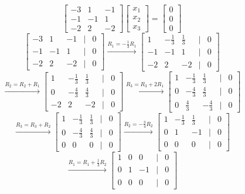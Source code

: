 \documentclass[12pt]{extarticle} %
\begin{document}
\begin{enumerate}
\[    \]
    \[
    \begin{bmatrix} -3 & 1 & -1\\ -1 & -1 & 1 \\ -2 & 2 & -2 \end{bmatrix} \begin{bmatrix} x_1 \\ x_2 \\ x_3 \end{bmatrix} = \begin{bmatrix} 0 \\ 0 \\ 0 \end{bmatrix}
    \]
    \[
    \begin{bmatrix} -3 & 1 & -1 & | & 0\\ -1 & -1 & 1 & | & 0 \\ -2 & 2 & -2 & | & 0 \end{bmatrix} \xrightarrow{R_1 = -\frac{1}{3}R_1} \begin{bmatrix} 1 & -\frac{1}{3} & \frac{1}{3} & | & 0\\ -1 & -1 & 1 & | & 0 \\ -2 & 2 & -2 & | & 0 \end{bmatrix}
    \]
    \[
    \xrightarrow{R_2 = R_2 + R_1} \begin{bmatrix} 1 & -\frac{1}{3} & \frac{1}{3} & | & 0\\ 0 & -\frac{4}{3} & \frac{4}{3} & | & 0 \\ -2 & 2 & -2 & | & 0 \end{bmatrix} \xrightarrow{R_3 = R_3 + 2R_1} \begin{bmatrix} 1 & -\frac{1}{3} & \frac{1}{3} & | & 0\\ 0 & -\frac{4}{3} & \frac{4}{3} & | & 0 \\ 0 & \frac{4}{3} & -\frac{4}{3} & | & 0 \end{bmatrix}
    \]
    \[
    \xrightarrow{R_3 = R_3 + R_2} \begin{bmatrix} 1 & -\frac{1}{3} & \frac{1}{3} & | & 0\\ 0 & -\frac{4}{3} & \frac{4}{3} & | & 0 \\ 0 & 0 & 0 & | & 0 \end{bmatrix} \xrightarrow{R_2 = -\frac{3}{4}R_2} \begin{bmatrix} 1 & -\frac{1}{3} & \frac{1}{3} & | & 0\\ 0 & 1 & -1 & | & 0 \\ 0 & 0 & 0 & | & 0 \end{bmatrix}
    \]
    \[
    \xrightarrow{R_1 = R_1 + \frac{1}{3}R_2} \begin{bmatrix} 1 & 0 & 0 & | & 0\\ 0 & 1 & -1 & | & 0 \\ 0 & 0 & 0 & | & 0 \end{bmatrix}
\]
\end{enumerate}
\end{document}
